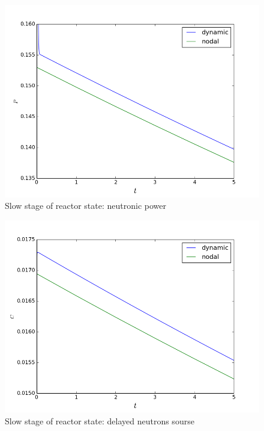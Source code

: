 \documentclass[authoryear]{elsarticle}
\begin{document}
\begin{figure}[!h]
  \begin{center}
    \includegraphics[width=0.9\linewidth] {15.png}
	\caption{Slow stage of reactor state: neutronic power}
	\label{fig:15}
  \end{center}
\end{figure} 

\begin{figure}[!h]
  \begin{center}
    \includegraphics[width=0.9\linewidth] {16.png}
	\caption{Slow stage of reactor state: delayed neutrons sourse}
	\label{fig:16}
  \end{center}
\end{figure} 
\end{document}
